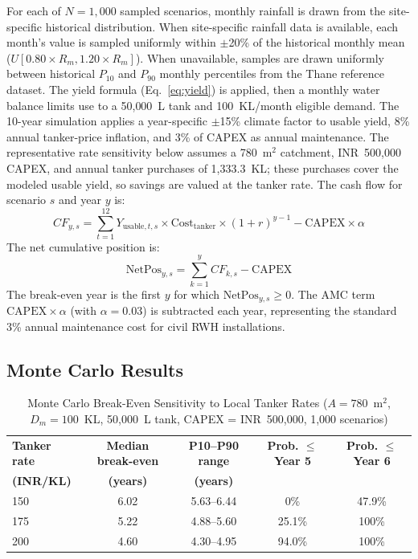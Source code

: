 ﻿\documentclass[conference]{IEEEtran}
\begin{document}
For each of $N = 1{,}000$ sampled scenarios, monthly rainfall is drawn from the site-specific historical distribution. When site-specific rainfall data is available, each month's value is sampled uniformly within $\pm$20\% of the historical monthly mean ($U[0.80 \times R_m, 1.20 \times R_m]$). When unavailable, samples are drawn uniformly between historical $P_{10}$ and $P_{90}$ monthly percentiles from the Thane reference dataset. The yield formula (Eq.~\ref{eq:yield}) is applied, then a monthly water balance limits use to a 50{,}000~L tank and 100~KL/month eligible demand. The 10-year simulation applies a year-specific $\pm$15\% climate factor to usable yield, 8\% annual tanker-price inflation, and 3\% of CAPEX as annual maintenance. The representative rate sensitivity below assumes a 780~m$^2$ catchment, INR~500{,}000 CAPEX, and annual tanker purchases of 1{,}333.3~KL; these purchases cover the modeled usable yield, so savings are valued at the tanker rate. The cash flow for scenario $s$ and year $y$ is:
\begin{equation}
  CF_{y,s} = \sum_{t=1}^{12} Y_{\text{usable},t,s}
             \times \text{Cost}_{\text{tanker}}
             \times (1+r)^{y-1}
             - \text{CAPEX} \times \alpha
  \label{eq:cashflow}
\end{equation}
The net cumulative position is:
\begin{equation}
  \text{NetPos}_{y,s} = \sum_{k=1}^{y} CF_{k,s} - \text{CAPEX}
  \label{eq:netpos}
\end{equation}
The break-even year is the first $y$ for which $\text{NetPos}_{y,s} \geq 0$. The AMC term $\text{CAPEX} \times \alpha$ (with $\alpha = 0.03$) is subtracted each year, representing the standard 3\% annual maintenance cost for civil RWH installations.

\subsection{Monte Carlo Results}

\begin{table}[htbp]
\caption{Monte Carlo Break-Even Sensitivity to Local Tanker Rates
($A = 780$~m$^2$, $D_m = 100$~KL, 50{,}000~L tank, CAPEX = INR~500,000, 1,000 scenarios)}
\begin{center}
\begin{tabular}{lcccc}
\toprule
\textbf{Tanker rate} & \textbf{Median break-even} & \textbf{P10--P90 range} &
  \textbf{Prob. $\leq$ Year 5} & \textbf{Prob. $\leq$ Year 6} \\
\textbf{(INR/KL)} & \textbf{(years)} & \textbf{(years)} & & \\
\midrule
150 & 6.02 & 5.63--6.44 & 0\% & 47.9\% \\
175 & 5.22 & 4.88--5.60 & 25.1\% & 100\% \\
200 & 4.60 & 4.30--4.95 & 94.0\% & 100\% \\
\bottomrule
\end{tabular}
\label{tab:mc}
\end{center}
\end{table}
\end{document}
